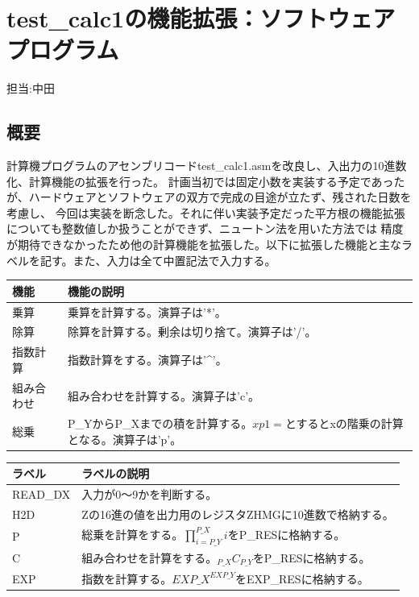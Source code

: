 \documentclass{jsarticle}
\begin{document}
\section*{test\_calc1の機能拡張：ソフトウェアプログラム}
担当:中田\\
\subsection*{概要}
計算機プログラムのアセンブリコードtest\_calc1.asmを改良し、入出力の10進数化、計算機能の拡張を行った。
計画当初では固定小数を実装する予定であったが、ハードウェアとソフトウェアの双方で完成の目途が立たず、残された日数を考慮し、
今回は実装を断念した。それに伴い実装予定だった平方根の機能拡張についても整数値しか扱うことができず、ニュートン法を用いた方法では
精度が期待できなかったため他の計算機能を拡張した。以下に拡張した機能と主なラベルを記す。また、入力は全て中置記法で入力する。

\begin{table}[h]
  \begin{tabular}{|l|p{10cm}|} \hline
    機能 & 機能の説明 \\ \hline
    乗算 & 乗算を計算する。演算子は'*'。 \\ \hline
    除算 & 除算を計算する。剰余は切り捨て。演算子は'/'。 \\ \hline
    指数計算 & 指数計算をする。演算子は'\^{}'。 \\ \hline
    組み合わせ & 組み合わせを計算する。演算子は'c'。 \\ \hline
    総乗 & P\_YからP\_Xまでの積を計算する。$x p 1 =$とするとxの階乗の計算となる。演算子は'p'。 \\ \hline 
  \end{tabular}
\end{table}

\begin{table}[h]
  \begin{tabular}{|l|p{10cm}|} \hline
    ラベル & ラベルの説明 \\ \hline
    READ\_DX & 入力が0～9かを判断する。 \\ \hline
    H2D & Zの16進の値を出力用のレジスタZHMGに10進数で格納する。	\\	\hline
    P & 総乗を計算をする。$\prod_{i=P\_Y}^{P\_X} i$をP\_RESに格納する。 \\ \hline
    C & 組み合わせを計算をする。${}_{P\_X}C_{P\_Y}$をP\_RESに格納する。 \\ \hline
    EXP & 指数を計算する。${EXP\_X}^{EXP\_Y}$をEXP\_RESに格納する。 \\ \hline 
  \end{tabular}
\end{table}
\end{document}
